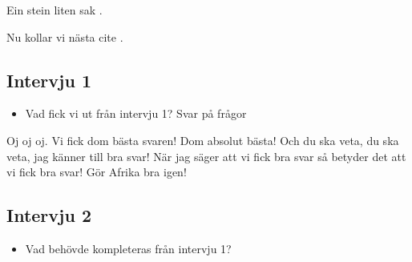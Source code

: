 Ein stein liten sak \cite{dne}.

Nu kollar vi nästa cite \cite{macgregor}.

%
%

\subsection{Intervju 1}
\begin{itemize}
    \item Vad fick vi ut från intervju 1? Svar på frågor
\end{itemize}
Oj oj oj.
Vi fick dom bästa svaren!
Dom absolut bästa!
Och du ska veta, du ska veta, jag känner till bra svar!
När jag säger att vi fick bra svar så betyder det att vi fick bra svar!
Gör Afrika bra igen!

%
%

\subsection{Intervju 2}
\begin{itemize}
    \item Vad behövde kompleteras från intervju 1?
\end{itemize}